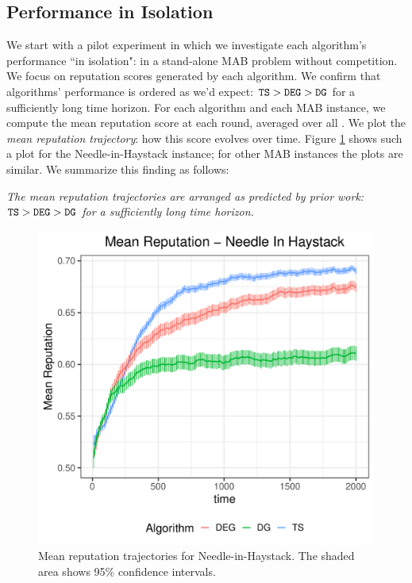 \documentclass[../competing_bandits.tex]{subfiles}
\begin{document}
\subsection{Performance in Isolation}\label{sec:isolation}

We start with a pilot experiment in which we investigate each algorithm's performance ``in isolation": in a stand-alone MAB problem without competition. We focus on reputation scores generated by each algorithm. We confirm that algorithms' performance is ordered as we'd expect:
    $\mathtt{TS} > \mathtt{DEG} > \mathtt{DG}$
for a sufficiently long time horizon. For each algorithm and each MAB instance, we compute the mean reputation score at each round, averaged over all \MRVs. We plot the \emph{mean reputation trajectory}: how this score evolves over time. Figure \ref{prelim_means} shows such a plot for the Needle-in-Haystack instance; for other MAB instances the plots are similar. We summarize this finding as follows:

\begin{finding}
\textit{The mean reputation trajectories are arranged as predicted by prior work:
    $\mathtt{TS} > \mathtt{DEG} > \mathtt{DG}$ for a sufficiently long time horizon.}
\end{finding}


\begin{figure}
\includegraphics[scale=0.35]{ec19paper/figures/nih_iso_mean}
\caption{Mean reputation trajectories for Needle-in-Haystack. The shaded area shows 95\% confidence intervals.}
\label{prelim_means}
\end{figure}
\end{document}
